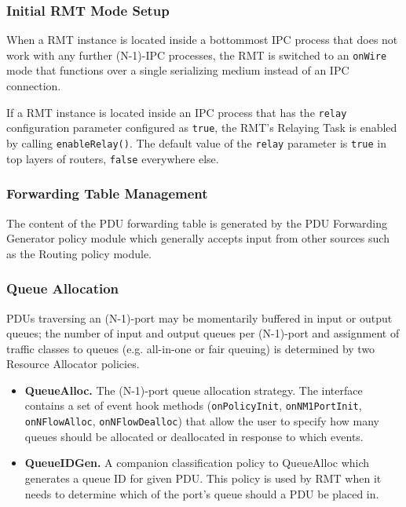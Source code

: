             \subsubsection{Initial RMT Mode Setup}

                When a RMT instance is located inside a bottommost IPC process that does not work with any further (N-1)-IPC processes, the RMT is switched to an \texttt{onWire} mode that functions over a single serializing medium instead of an IPC connection.

                If a RMT instance is located inside an IPC process that has the \texttt{relay} configuration parameter configured as \texttt{true}, the RMT's Relaying Task is enabled by calling \texttt{enableRelay()}. The default value of the \texttt{relay} parameter is \texttt{true} in top layers of routers, \texttt{false} everywhere else.

            \subsubsection{Forwarding Table Management}

                The content of the PDU forwarding table is generated by the PDU Forwarding Generator policy module which generally accepts input from other sources such as the Routing policy module.

            \subsubsection{Queue Allocation}

                PDUs traversing an (N-1)-port may be momentarily buffered in input or output queues; the number of input and output queues per (N-1)-port and assignment of traffic classes to queues (e.g. all-in-one or fair queuing)
                is determined by two Resource Allocator policies.

                \begin{itemize}
                    \item \textbf{QueueAlloc.} The (N-1)-port queue allocation strategy. The interface contains a set of event hook methods (\texttt{onPolicyInit}, \texttt{onNM1PortInit}, \texttt{onNFlowAlloc}, \texttt{onNFlowDealloc}) that allow the user to specify how many queues should be allocated or deallocated in response to which events.
                    \item \textbf{QueueIDGen.} A companion classification policy to QueueAlloc which generates a queue ID for given PDU. This policy is used by RMT when it needs to determine which of the port's queue should a PDU be placed in.
                \end{itemize}

